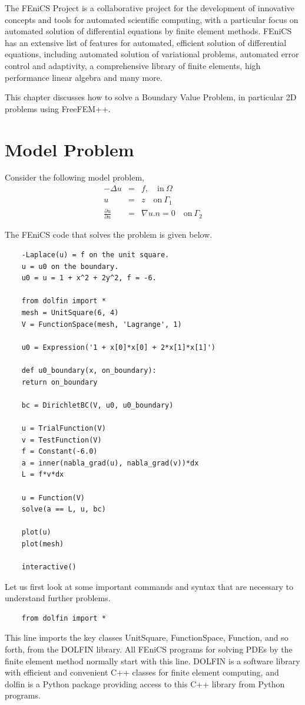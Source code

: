
The FEniCS Project is a collaborative project for the development of innovative concepts and tools for automated scientific computing, with a particular focus on automated solution of differential equations by finite element methods. 
FEniCS has an extensive list of features for automated, efficient solution of differential equations, including automated solution of variational problems, automated error control and adaptivity, a comprehensive library of finite elements, high performance linear algebra and many more.

\smallskip
\noindent This chapter discusses how to solve a Boundary Value Problem, in particular 2D problems using FreeFEM++.

\section{Model Problem}
Consider the following model problem,
\begin{eqnarray}
	-\Delta u &=& f, \quad \text{in} \ \Omega \\
	u &=& z \quad \text{on} \ \Gamma_1\\
	\frac{\partial u}{\partial n}  &=& \nabla u . n = 0 \quad \text{on} \ \Gamma_2
\end{eqnarray}

The FEniCS code that solves the problem is given below.

\lstset{language = python}
\begin{lstlisting}
	-Laplace(u) = f on the unit square.
	u = u0 on the boundary.
	u0 = u = 1 + x^2 + 2y^2, f = -6.
	
	from dolfin import *
	mesh = UnitSquare(6, 4)
	V = FunctionSpace(mesh, 'Lagrange', 1)
	
	u0 = Expression('1 + x[0]*x[0] + 2*x[1]*x[1]')
	
	def u0_boundary(x, on_boundary):
	return on_boundary
	
	bc = DirichletBC(V, u0, u0_boundary)
	
	u = TrialFunction(V)
	v = TestFunction(V)
	f = Constant(-6.0)
	a = inner(nabla_grad(u), nabla_grad(v))*dx
	L = f*v*dx
	
	u = Function(V)
	solve(a == L, u, bc)
	
	plot(u)
	plot(mesh)
	
	interactive()
\end{lstlisting}

Let us first look at some important commands and syntax that are necessary to understand further problems.
\begin{lstlisting}
	from dolfin import *
\end{lstlisting}
This line imports the key classes UnitSquare, FunctionSpace, Function, and so forth, from the DOLFIN library. All FEniCS programs for solving PDEs by the finite element method normally start with this line. DOLFIN is a software library with efficient and convenient C++ classes for finite element computing, and dolfin is a Python package providing access to this C++ library from Python programs.

